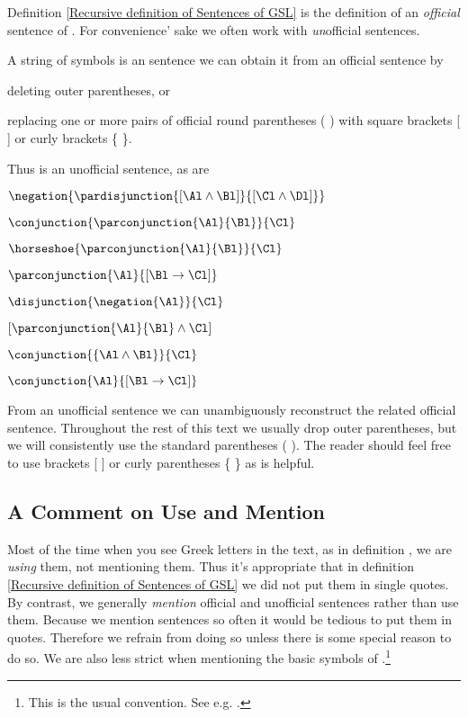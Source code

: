 Definition \ref{Recursive definition of Sentences of GSL} is the definition of an \emph{official} sentence of \GSL{}.
For convenience' sake we often work with \emph{un}official sentences. 
\begin{majorILnc}{}
A string of symbols is an  sentence \Iff we can obtain it from an official sentence by
\begin{cenumerate}
\item deleting outer parentheses, or
\item replacing one or more pairs of official round parentheses ( ) with square brackets [ ] or curly brackets \{ \}.
\end{cenumerate}
\end{majorILnc}
\noindent{}Thus \mention{$\conjunction{\Al}{\conjunction{\Bl}{\Cl}}$} is an unofficial sentence, as are
\begin{multicols}{2}
\begin{smenumerate}
\item\label{usex1} $\negation{\pardisjunction{[\Al\wedge\Bl]}{[\Cl\wedge\Dl]}}$
\item $\conjunction{\parconjunction{\Al}{\Bl}}{\Cl}$
\item $\horseshoe{\parconjunction{\Al}{\Bl}}{\Cl}$
\item $\parconjunction{\Al}{[\Bl\rightarrow\Cl]}$
\item $\disjunction{\negation{\Al}}{\Cl}$
\item $[\parconjunction{\Al}{\Bl}\wedge\Cl]$
\item $\conjunction{\{\Al\wedge\Bl\}}{\Cl}$
\item\label{usexL} $\conjunction{\Al}{[\Bl\rightarrow\Cl]}$
\end{smenumerate}
\end{multicols}
\noindent{}From an unofficial sentence we can unambiguously reconstruct the related official sentence. 
Throughout the rest of this text we usually drop outer parentheses, but we will consistently use the standard parentheses ( ). 
The reader should feel free to use brackets [ ] or curly parentheses \{ \} as is helpful. 

\subsection{A Comment on Use and Mention}\label{use mention comment}

Most of the time when you see Greek letters in the text, as in definition , we are \emph{using} them, not mentioning them. 
Thus it's appropriate that in definition \ref{Recursive definition of Sentences of GSL} we did not put them in single quotes.
By contrast, we generally \emph{mention} official and unofficial \GSL{} sentences rather than use them.
Because we mention \GSL{} sentences so often it would be tedious to put them in quotes. 
Therefore we refrain from doing so unless there is some special reason to do so.  
We are also less strict when mentioning the basic symbols of \GSL{}.\footnote{This is the usual convention. See e.g. \citealt[7]{Hodges2001}.}

